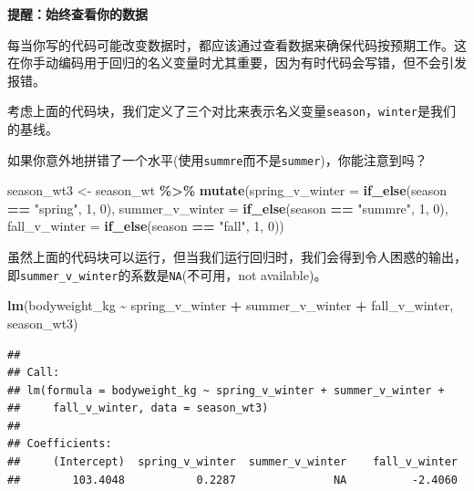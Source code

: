 \documentclass[
]{book}
\newenvironment{Shaded}{\begin{snugshade}}{\end{snugshade}}
\newcommand{\AttributeTok}[1]{\textcolor[rgb]{0.13,0.29,0.53}{#1}}
\newcommand{\DecValTok}[1]{\textcolor[rgb]{0.00,0.00,0.81}{#1}}
\newcommand{\FunctionTok}[1]{\textcolor[rgb]{0.13,0.29,0.53}{\textbf{#1}}}
\newcommand{\NormalTok}[1]{#1}
\newcommand{\OtherTok}[1]{\textcolor[rgb]{0.56,0.35,0.01}{#1}}
\newcommand{\SpecialCharTok}[1]{\textcolor[rgb]{0.81,0.36,0.00}{\textbf{#1}}}
\newcommand{\StringTok}[1]{\textcolor[rgb]{0.31,0.60,0.02}{#1}}
\begin{document}
\textbf{提醒：始终查看你的数据}

每当你写的代码可能改变数据时，都应该通过查看数据来确保代码按预期工作。这在你手动编码用于回归的名义变量时尤其重要，因为有时代码会写错，但不会引发报错。

考虑上面的代码块，我们定义了三个对比来表示名义变量\texttt{season}，\texttt{winter}是我们的基线。

如果你意外地拼错了一个水平(使用\texttt{summre}而不是\texttt{summer})，你能注意到吗？

\begin{Shaded}
\begin{Highlighting}[]
\NormalTok{season\_wt3 }\OtherTok{\textless{}{-}}\NormalTok{ season\_wt }\SpecialCharTok{\%\textgreater{}\%}
  \FunctionTok{mutate}\NormalTok{(}\AttributeTok{spring\_v\_winter =} \FunctionTok{if\_else}\NormalTok{(season }\SpecialCharTok{==} \StringTok{"spring"}\NormalTok{, }\DecValTok{1}\NormalTok{, }\DecValTok{0}\NormalTok{),}
         \AttributeTok{summer\_v\_winter =} \FunctionTok{if\_else}\NormalTok{(season }\SpecialCharTok{==} \StringTok{"summre"}\NormalTok{, }\DecValTok{1}\NormalTok{, }\DecValTok{0}\NormalTok{),}
         \AttributeTok{fall\_v\_winter =} \FunctionTok{if\_else}\NormalTok{(season }\SpecialCharTok{==} \StringTok{"fall"}\NormalTok{, }\DecValTok{1}\NormalTok{, }\DecValTok{0}\NormalTok{))}
\end{Highlighting}
\end{Shaded}

虽然上面的代码块可以运行，但当我们运行回归时，我们会得到令人困惑的输出，即\texttt{summer\_v\_winter}的系数是\texttt{NA}(不可用，not available)。

\begin{Shaded}
\begin{Highlighting}[]
\FunctionTok{lm}\NormalTok{(bodyweight\_kg }\SpecialCharTok{\textasciitilde{}}\NormalTok{ spring\_v\_winter }\SpecialCharTok{+}\NormalTok{ summer\_v\_winter }\SpecialCharTok{+}\NormalTok{ fall\_v\_winter,}
\NormalTok{   season\_wt3)}
\end{Highlighting}
\end{Shaded}

\begin{verbatim}
## 
## Call:
## lm(formula = bodyweight_kg ~ spring_v_winter + summer_v_winter + 
##     fall_v_winter, data = season_wt3)
## 
## Coefficients:
##     (Intercept)  spring_v_winter  summer_v_winter    fall_v_winter  
##        103.4048           0.2287               NA          -2.4060
\end{verbatim}
\end{document}
